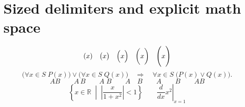 \documentclass[11pt]{article}
\begin{document}
\pagestyle{empty}
\section*{Sized delimiters and explicit math space}
\[
(x)\quad\bigl(x\bigr)\quad\Bigl(x\Bigr)\quad
\biggl(x\biggr)\quad\Biggl(x\Biggr)
\]
\[
\bigl(\forall x\in S\;P(x)\bigr)\vee
\bigl(\forall x\in S\;Q(x)\bigr)
\quad\Longrightarrow\quad
\forall x\in S\;\bigl(P(x)\vee Q(x)\bigr).
\]
\[
A B\qquad A\,B\qquad A\;B\qquad A\quad B\qquad
A\qquad B\qquad A\!B
\]
\[
\left\{x\in\mathbb{R}\;\middle|\;
\left|\frac{x}{1+x^2}\right|<1\right\}
\qquad
\left.\frac{d}{dx}x^2\right|_{x=1}
\]
\end{document}
